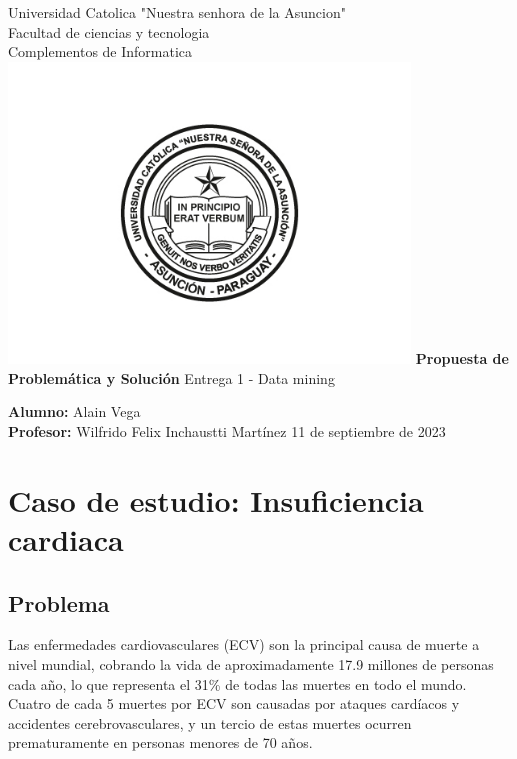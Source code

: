 \documentclass[12pt, letterpaper, spanish]{article}
\begin{document}
\begin{titlepage}
  \begin{center}
      \Large{Universidad Catolica "Nuestra senhora de la Asuncion" \\
      Facultad de ciencias y tecnologia \\
      Complementos de Informatica}
      \includegraphics[width=0.8\textwidth]{UcaLogo.jpg}
      \LARGE{\textbf{Propuesta de Problemática y Solución}}
      \Large{Entrega 1 - Data mining}
      \vspace{1cm}
  \end{center}
      \large
      \textbf{Alumno: }Alain Vega \\
      \textbf{Profesor: }Wilfrido Felix Inchaustti Martínez
      \vfill
      \hfill{11 de septiembre de 2023}
\end{titlepage}

\newpage
\tableofcontents %
\newpage

\section{Caso de estudio: Insuficiencia cardiaca}
\subsection{Problema}
Las enfermedades cardiovasculares (ECV) son la principal causa de muerte a nivel mundial, 
cobrando la vida de aproximadamente 17.9 millones de personas cada año, 
lo que representa el 31\% de todas las muertes en todo el mundo. 
Cuatro de cada 5 muertes por ECV son causadas por ataques cardíacos y accidentes cerebrovasculares, 
y un tercio de estas muertes ocurren prematuramente en personas menores de 70 años. 
\end{document}
